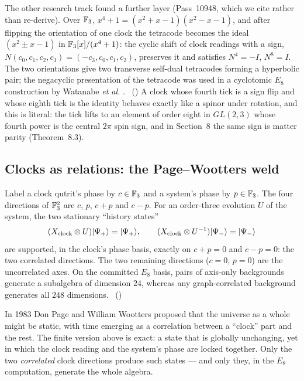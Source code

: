 The other research track found a further layer (Pass~10948, which we cite rather than
re-derive). Over $\mathbb{F}_3$, $x^4+1=(x^2+x-1)(x^2-x-1)$, and after flipping the orientation of
one clock the tetracode becomes the ideal $(x^2\pm x-1)$ in $\mathbb{F}_3[x]/(x^4+1)$: the cyclic
shift of clock readings with a sign, $N(c_0,c_1,c_2,c_3)=(-c_3,c_0,c_1,c_2)$, preserves it
and satisfies $N^4=-I$, $N^8=I$. The two orientations give two transverse self-dual
tetracodes forming a hyperbolic pair; the negacyclic presentation of the tetracode was used
in a cyclotomic $E_8$ construction by Watanabe \emph{et al.} \cite{WBCV2018}. \tierC\
() A clock whose
fourth tick is a sign flip and whose eighth tick is the identity behaves exactly like a
spinor under rotation, and this is literal: the tick lifts to an element of order eight in
$GL(2,3)$ whose fourth power is the central $2\pi$ spin sign, and in Section~8 the same sign
is matter parity (Theorem~8.3).

\subsection{Clocks as relations: the Page--Wootters weld}

Label a clock qutrit's phase by $c\in\mathbb{F}_3$ and a system's phase by $p\in\mathbb{F}_3$. The four
directions of $\mathbb{F}_3^2$ are $c$, $p$, $c+p$ and $c-p$. For an order-three evolution $U$ of
the system, the two stationary ``history states''
\[
(X_{\text{clock}}\otimes U)\lvert \Psi_+\rangle=\lvert \Psi_+\rangle,\qquad
(X_{\text{clock}}\otimes U^{-1})\lvert \Psi_-\rangle=\lvert \Psi_-\rangle
\]
are supported, in the clock's phase basis, exactly on $c+p=0$ and $c-p=0$: the two
correlated directions. The two remaining directions ($c=0$, $p=0$) are the uncorrelated
axes. On the committed $E_8$ basis, pairs of axis-only backgrounds generate a subalgebra of
dimension $24$, whereas any graph-correlated background generates all $248$
dimensions. \tierC\ (\cert{w33\_20260924\_page\_wootters\_diagonal\_weld.py})

\begin{plainwords}
In 1983 Don Page and William Wootters proposed \cite{PageWootters} that the universe as a whole might be
static, with time emerging as a correlation between a ``clock'' part and the rest. The
finite version above is exact: a state that is globally unchanging, yet in which the
clock reading and the system's phase are locked together. Only the two
\emph{correlated} clock directions produce such states --- and only they, in the $E_8$
computation, generate the whole algebra.
\end{plainwords}

